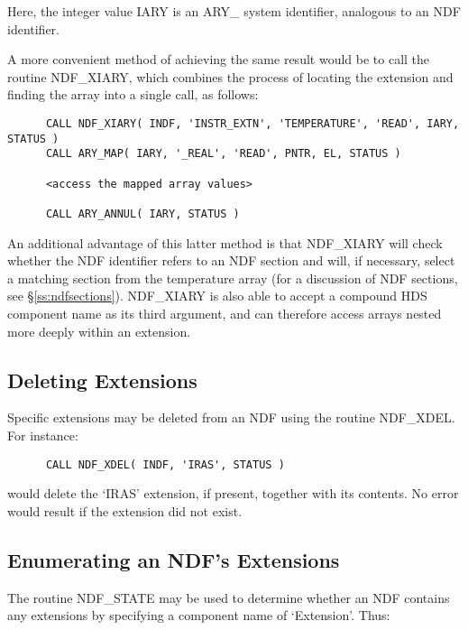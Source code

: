 \documentclass[twoside,11pt]{article}
\newcommand{\htmlref}[2]{#1}
\newcommand{\xref}[3]{#1}
\newcommand{\xlabel}[1]{}
\begin{document}
Here, the integer value IARY is an ARY\_ system identifier, analogous to an NDF
identifier.

A more convenient method of achieving the same result would be to call the
routine \htmlref{NDF\_XIARY}{NDF_XIARY}, which combines the process of locating the extension and
finding the array into a single call, as follows:

\small
\begin{verbatim}
      CALL NDF_XIARY( INDF, 'INSTR_EXTN', 'TEMPERATURE', 'READ', IARY, STATUS )
      CALL ARY_MAP( IARY, '_REAL', 'READ', PNTR, EL, STATUS )

      <access the mapped array values>

      CALL ARY_ANNUL( IARY, STATUS )
\end{verbatim}
\normalsize

An additional advantage of this latter method is that NDF\_XIARY will
check whether the NDF identifier refers to an NDF section and will, if
necessary, select a matching section from the temperature array (for a
discussion of NDF sections, see \S\ref{ss:ndfsections}). NDF\_XIARY is
also able to accept a compound \xref{HDS}{sun92}{} component name as
its third argument, and can therefore access arrays nested more deeply
within an extension.

\subsection{\xlabel{deleting_extensions}Deleting Extensions}

Specific extensions may be deleted from an NDF using the routine \htmlref{NDF\_XDEL}{NDF_XDEL}.
For instance:

\small
\begin{verbatim}
      CALL NDF_XDEL( INDF, 'IRAS', STATUS )
\end{verbatim}
\normalsize

would delete the `IRAS' extension, if present, together with its contents.
No error would result if the extension did not exist. 

\subsection{\xlabel{enumerating_an_ndfs_extensions}Enumerating an NDF's Extensions}

The routine \htmlref{NDF\_STATE}{NDF_STATE} may be used to determine whether an NDF contains any 
extensions by specifying a component name of `Extension'.
Thus:
\end{document}
